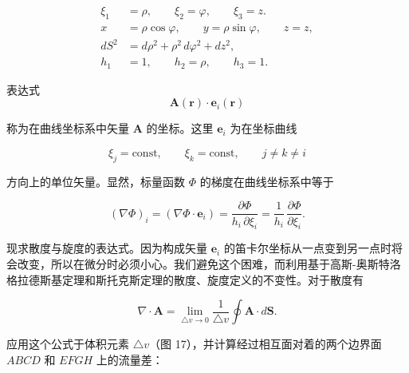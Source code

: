 \documentclass[11pt,a4paper,oneside]{ctexbook}
\newcommand{\ve}[1]{\bm{#1}}
\begin{document}
\begin{equation*}
\begin{aligned}
\xi_1 &= \rho, \qquad \xi_2 = \varphi, \qquad \xi_3 = z.\\
x &= \rho \cos\varphi, \qquad y = \rho \sin\varphi, \qquad z = z,\\
dS^{2} &= d\rho^{2} + \rho^{2}\, d\varphi^{2} + dz^{2},\\
h_1 &= 1, \qquad h_2 = \rho, \qquad h_3 = 1.
\end{aligned}
\end{equation*}

表达式
\begin{equation*}
\ve{A}(\ve{r}) \cdot \ve{e}_i(\ve{r})
\end{equation*}

称为在曲线坐标系中矢量 $\ve{A}$ 的坐标。这里 $\ve{e}_i$ 为在坐标曲线

\begin{equation*}
\xi_j = \text{const}, \qquad \xi_k = \text{const}, \qquad j \neq k \neq i
\end{equation*}

方向上的单位矢量。显然，标量函数 $\Phi$ 的梯度在曲线坐标系中等于

\begin{equation*}
(\nabla\Phi)_i = (\nabla\Phi \cdot \ve{e}_i) = \frac{\partial\Phi}{h_i\, \partial\xi_i} = \frac{1}{h_i}\, \frac{\partial\Phi}{\partial\xi_i}.
\end{equation*}

现求散度与旋度的表达式。因为构成矢量 $\ve{e}_i$ 的笛卡尔坐标从一点变到另一点时将会改变，所以在微分时必须小心。我们避免这个困难，而利用基于高斯-奥斯特洛格拉德斯基定理和斯托克斯定理的散度、旋度定义的不变性。对于散度有

\begin{equation*}
\nabla \cdot \ve{A} = \lim_{\triangle v \to 0} \frac{1}{\triangle v} \oint \ve{A} \cdot d\ve{S}.
\end{equation*}

应用这个公式于体积元素 $\triangle v$（图 17），并计算经过相互面对着的两个边界面 $ABCD$ 和 $EFGH$ 上的流量差：
\end{document}

